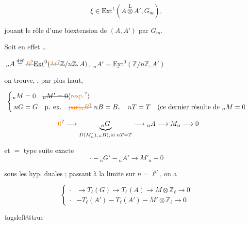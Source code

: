 \[\xi\in\mathrm{Ext}^{1}(A\overset{\mathrm L}{\otimes}A',G_m),\]

jouant le rôle d'une biextension de $(A,A')$ par $G_m$.


Soit en effet \ldots

\quad $\,{}_nA\overset{\text{déf}}{=}\deleted{\unsure{R}}\underline{\mathrm{Ext}}^{0}(\deleted{\unsure{M}}\mathbb{Z}/n\mathbb{Z},A)$, $\,{}_nA'=\underline{\mathrm{Ext}}^0(\mathbb{Z}/n\mathbb{Z},A')$

on trouve, , par  plus haut,


\uline{}
\[\left\{\begin{aligned}
 {}_nM&=0\quad\deleted{{}_nM'=0}\inserted{\unsure{\text{resp.}}}\\
 nG&=G\quad\text{p. ex.}\quad\deleted{\unsure{\text{par}|{}_nB}}\;nB=B,\quad nT=T\quad(\text{ce dernier résulte de }{}_nM=0
\end{aligned}\right.\]

\[\unsure{\cdot|0}\longrightarrow\underbrace{{}_nG}_{D(M'_n),\,{}_nB),\,\text{si }nT=T}\longrightarrow{}_nA\longrightarrow M_n\longrightarrow 0\]

et  $=$ type suite exacte
\[\cdot\mathbin{-}{}_nG'\mathbin{-}{}_nA'\longrightarrow M'_n\mathbin{-}0\]

sous les hyp. duales ; passant à la limite sur $n=\ell^\nu$, on a

\[\left\{\begin{aligned}
\cdot&\longrightarrow T_\ell(G)\longrightarrow T_\ell(A)\longrightarrow M\otimes\mathbb Z_\ell\longrightarrow 0\\
\cdot&\mathbin{-}T_\ell(A')\mathbin{-}T_\ell(A')\mathbin{-}M'\otimes\mathbb Z_\ell\longrightarrow 0
\end{aligned}\right.\]

\begingroup\csname tagsleft@true\endcsname


